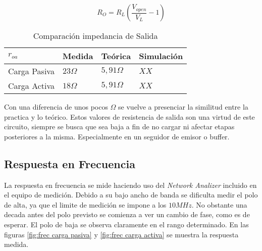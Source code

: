 \begin{equation}
    R_O = R_L(\frac{V_{open}}{V_L}-1)
    \label{eq:zout teor}
\end{equation}

\begin{table}[ht]
    \centering
    \begin{tabular}{|l|l|l|l|}
    \hline
    $r_{oa}$     & Medida     & Teórica         & Simulación \\ \hline
    Carga Pasiva & $23\Omega$ & $5,91\Omega $   &  $XX $          \\ \hline
    Carga Activa & $18\Omega$ &  $5,91\Omega $  &  $XX $          \\ \hline
    \end{tabular}
    \caption{Comparación impedancia de Salida}\label{table:Ro comp}
\end{table}

Con una diferencia de unos pocos $\Omega$ se vuelve a presenciar la similitud entre la practica y lo teórico. Estos valores de resistencia de salida son una virtud de este circuito, siempre se busca que sea baja a fin de no cargar ni afectar etapas posteriores a la misma. Especialmente en un seguidor de emisor o buffer.

\subsection{Respuesta en Frecuencia}

La respuesta en frecuencia se mide haciendo uso del \textit{Network Analizer} incluido en el equipo de medición. Debido a su bajo ancho de banda se dificulta medir el polo de alta, ya que el limite de medición se impone a los $10 MHz$. No obstante una decada antes del polo previsto se comienza a ver un cambio de fase, como es de esperar.
El polo de baja se observa claramente en el rango determinado. En las figuras \ref{fig:frec carga pasiva} y \ref{fig:frec carga activa} se muestra la respuesta medida.




